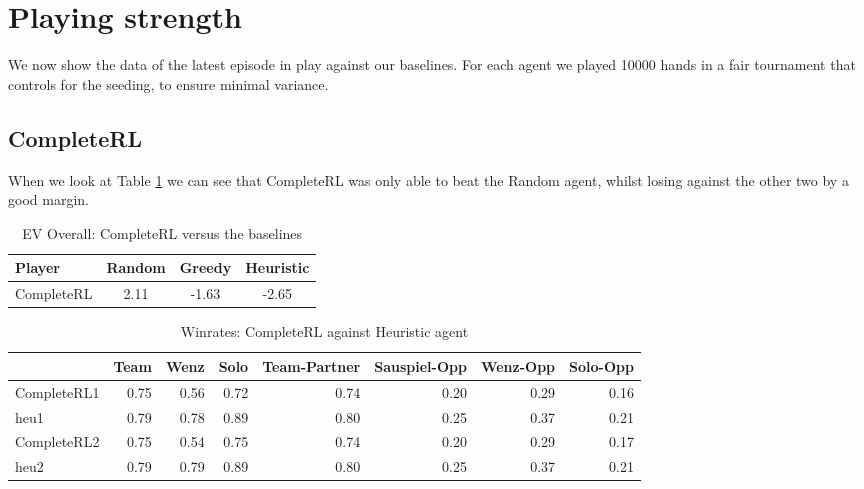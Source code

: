 \section{Playing strength}
We now show the data of the latest episode in play against our baselines.
For each agent we played 10000 hands in a fair tournament that controls for the seeding, to ensure minimal variance.

\subsection{CompleteRL}
When we look at Table \ref{tab:evCompleteRL} we can see that CompleteRL was only able to beat the Random agent,
whilst losing against the other two by a good margin.
\newline


\begin{table}[]
    \centering
    \begin{tabular}{lccc}
        \toprule
        Player     & Random & Greedy & Heuristic \\
        \midrule
        CompleteRL & 2.11   & -1.63  & -2.65     \\
        \bottomrule
    \end{tabular}
    \caption{EV Overall: CompleteRL versus the baselines}
    \label{tab:evCompleteRL}
\end{table}

\begin{table}
    \begin{tabular}{lrrrrrrr}
        \toprule
        {}          & Team & Wenz & Solo & Team-Partner & Sauspiel-Opp & Wenz-Opp & Solo-Opp \\
        \midrule
        CompleteRL1 & 0.75 & 0.56 & 0.72 & 0.74         & 0.20         & 0.29     & 0.16     \\
        heu1        & 0.79 & 0.78 & 0.89 & 0.80         & 0.25         & 0.37     & 0.21     \\
        CompleteRL2 & 0.75 & 0.54 & 0.75 & 0.74         & 0.20         & 0.29     & 0.17     \\
        heu2        & 0.79 & 0.79 & 0.89 & 0.80         & 0.25         & 0.37     & 0.21     \\
        \bottomrule
    \end{tabular}
    \caption{Winrates: CompleteRL against Heuristic agent}
    \label{tab:table}
\end{table}

